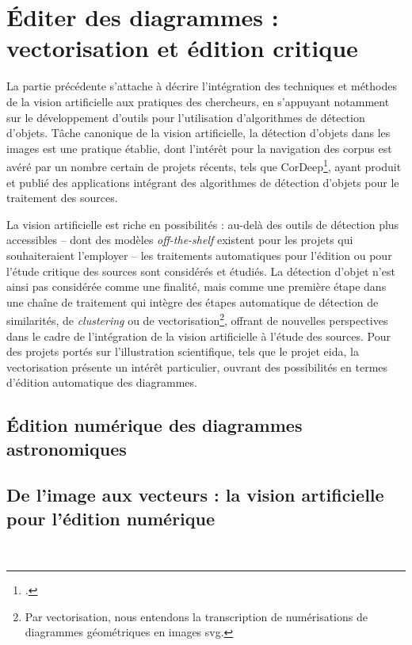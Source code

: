 \documentclass[a4paper,12pt,twoside]{book}
\newcommand{\eida}{\gls{eida}\xspace}
\newcommand{\svg}{\gls{svg}\xspace}
\begin{document}
        \chapter[Éditer des diagrammes]{Éditer des diagrammes : vectorisation et édition critique}
        La partie précédente s'attache à décrire l'intégration des techniques et méthodes de la vision artificielle aux pratiques des chercheurs, en s'appuyant notamment sur le développement d'outils pour l'utilisation d'algorithmes de détection d'objets. Tâche canonique de la vision artificielle, la détection d'objets dans les images est une pratique établie, dont l'intérêt pour la navigation des corpus est avéré par un nombre certain de projets récents, tels que CorDeep\footcite{CorDeep}, ayant produit et publié des applications intégrant des algorithmes de détection d'objets pour le traitement des sources.
        
        La vision artificielle est riche en possibilités : au-delà des outils de détection plus accessibles -- dont des modèles \textit{off-the-shelf} existent pour les projets qui souhaiteraient l'employer -- les traitements automatiques pour l'édition ou pour l'étude critique des sources sont considérés et étudiés. La détection d'objet n'est ainsi pas considérée comme une finalité, mais comme une première étape dans une chaîne de traitement qui intègre des étapes automatique de détection de similarités, de \textit{clustering} ou de vectorisation\footnote{Par vectorisation, nous entendons la transcription de numérisations de diagrammes géométriques en images \svg.}, offrant de nouvelles perspectives dans le cadre de l'intégration de la vision artificielle à l'étude des sources. Pour des projets portés sur l'illustration scientifique, tels que le projet \eida, la vectorisation présente un intérêt particulier, ouvrant des possibilités en termes d'édition automatique des diagrammes.
        
                \section{Édition numérique des diagrammes astronomiques}
                    
            
                \section[De l’image aux vecteurs]{\label{vectorEdition}De l’image aux vecteurs : la vision artificielle pour l’édition numérique}
                    
        \\
        
\end{document}
